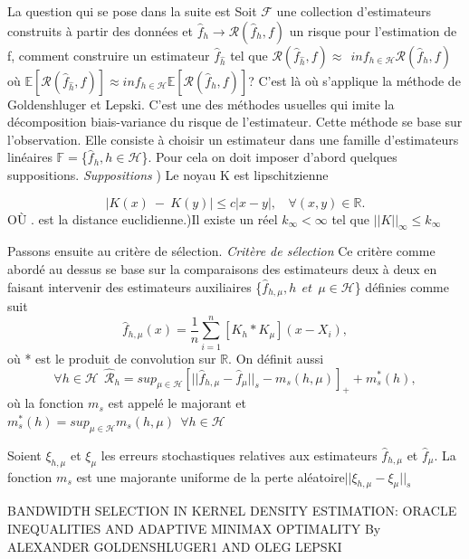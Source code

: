 \documentclass[
]{book}
\theoremstyle{definition}
\theoremstyle{definition}
\theoremstyle{definition}
\theoremstyle{definition}
\theoremstyle{remark}
\begin{document}
La question qui se pose dans la suite est \newline
Soit \(\mathcal{F}\) une collection d'estimateurs construits à partir des données et \(\hat{f}_h \rightarrow \mathcal{R}(\hat{f}_h,f)\) un risque pour l'estimation de f, comment construire un estimateur \(\hat{f}_{\hat h}\) tel que \(\mathcal{R}(\hat{f}_{\hat h},f) \approx~~inf_{h \in \mathcal{H}} \mathcal{R}(\hat{f}_h,f)\) où \(\mathbb{E}[\mathcal{R}(\hat{f}_{\hat{h}},f)] \approx inf_{h \in \mathcal {H}} \mathbb{E}[\mathcal{R}(\hat{f}_h,f)]\)?
C'est là où s'applique la méthode de Goldenshluger et Lepski. C'est une des méthodes usuelles qui imite la décomposition biais-variance du risque de l'estimateur. \newline
Cette méthode se base sur l'observation. Elle consiste à choisir un estimateur dans une famille d'estimateurs linéaires \(\mathbb{F} =\)\{\(\hat{f}_h,h \in \mathcal{H}\)\}. Pour cela on doit imposer d'abord quelques suppositions. \newline
\emph{Suppositions} ) Le noyau K est lipschitzienne\newline

\[
|K(x)~-~K(y)| \leq c|x-y|,~~~~\forall(x,y)\in \mathbb{R}.
\]
OÙ \textbar.\textbar{} est la distance euclidienne.)Il existe un réel \(k_{\infty}<\infty\) tel que \(||K||_{\infty} \leq k_{\infty}\)

Passons ensuite au critère de sélection.\newline
\emph{Critère de sélection} \newline
Ce critère comme abordé au dessus se base sur la comparaisons des estimateurs deux à deux en faisant intervenir des estimateurs auxiliaires \{\(\hat f_{h,\mu},h~~ et~~ \mu \in \mathcal{H}\)\} définies comme suit
\[
\hat f_{h,\mu}(x)=\frac{1}{n}\sum^n_{i=1}[K_h * K_{\mu}](x-X_i),
\]
où * est le produit de convolution sur \(\mathbb{R}\).\newline
On définit aussi\newline
\[
\forall h \in \mathcal{H}~~\hat{\mathcal R}_h = sup_{\mu \in \mathcal{H}}[||\hat f_{h,\mu}-\hat f_\mu ||_s - m_s(h,\mu)]_+ + m^*_s(h),
\]
où la fonction \(m_s\) est appelé le majorant et \(m^*_s(h) = sup_{\mu \in \mathcal{H}}m_s(h,\mu) ~~ \forall h \in \mathcal{H}\)\newline

\begin{prop}
Soient $\xi_{h,\mu}$ et $\xi_\mu$ les erreurs stochastiques relatives aux estimateurs $\hat f_{h,\mu}$ et $\hat f_\mu$.\newline
La fonction $m_s$ est une majorante uniforme de la perte aléatoire$||\xi_{h,\mu}-\xi_\mu||_s$
\end{prop}
\begin{demo}
BANDWIDTH SELECTION IN KERNEL DENSITY ESTIMATION:
ORACLE INEQUALITIES AND ADAPTIVE MINIMAX
OPTIMALITY By ALEXANDER GOLDENSHLUGER1 AND OLEG LEPSKI
\end{demo}
\end{document}
